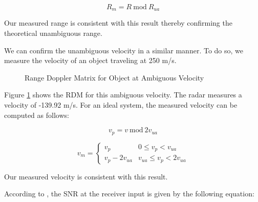 \documentclass[conference]{IEEEtran}
\begin{document}
	\begin{equation}
		R_m = R\ \text{mod}\ R_{ua}
	\end{equation}
	
	Our measured range is consistent with this result thereby confirming the theoretical unambiguous range.
	
	We can confirm the unambiguous velocity in a similar manner. To do so, we measure the velocity of an object traveling at 250 m/s.
	
	\begin{figure}[H]
	    	\centering
	    	\caption{Range Doppler Matrix for Object at Ambiguous Velocity}
	    	\label{fig::ambig_velocity} 
	\end{figure}
	
	Figure \ref{fig::ambig_velocity} shows the RDM for this ambiguous velocity. The radar measures a velocity of -139.92 m/s. For an ideal system, the measured velocity can be computed as follows:
	
	\begin{equation}
		v_p = v\ \text{mod}\ 2v_{ua}
	\end{equation}
	
	\begin{equation}
		v_m = \begin{cases}
			v_p & 0 \leq v_p < v_{ua} \\
			v_p - 2v_{ua} & v_{ua} \leq v_p < 2v_{ua}
		\end{cases}
	\end{equation}
	
	Our measured velocity is consistent with this result.
	
	According to \cite{richards-2005}, the SNR at the receiver input is given by the following equation:
	
\end{document}
